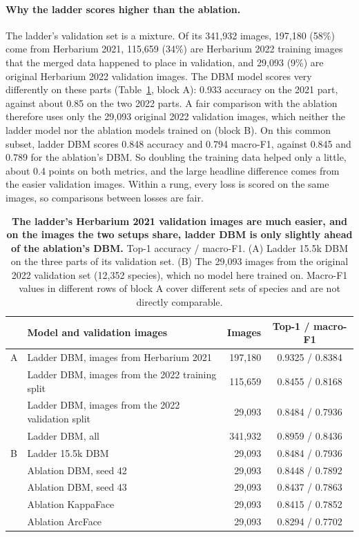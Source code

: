 \documentclass[11pt]{article}
\begin{document}
\paragraph{Why the ladder scores higher than the ablation.} The ladder's validation set is
a mixture. Of its 341{,}932 images, 197{,}180 (58\%) come from Herbarium 2021, 115{,}659
(34\%) are Herbarium 2022 training images that the merged data happened to place in
validation, and 29{,}093 (9\%) are original Herbarium 2022 validation images. The DBM
model scores very differently on these parts (Table~\ref{tab:datacheck}, block A): 0.933
accuracy on the 2021 part, against about 0.85 on the two 2022 parts. A fair comparison with
the ablation therefore uses only the 29{,}093 original 2022 validation images, which
neither the ladder model nor the ablation models trained on (block B). On this common
subset, ladder DBM scores 0.848 accuracy and 0.794 macro-F1, against 0.845 and 0.789 for
the ablation's DBM. So doubling the training data helped only a little, about 0.4 points on
both metrics, and the large headline difference comes from the easier validation images.
Within a rung, every loss is scored on the same images, so comparisons between losses are
fair.

\begin{table}[t]
\centering
\small
\caption{\textbf{The ladder's Herbarium 2021 validation images are much easier, and on the
images the two setups share, ladder DBM is only slightly ahead of the ablation's DBM.}
Top-1 accuracy / macro-F1. (A) Ladder 15.5k DBM on the three parts of its validation set.
(B) The 29{,}093 images from the original 2022 validation set (12{,}352 species), which no
model here trained on. Macro-F1 values in different rows of block A cover different sets
of species and are not directly comparable.}
\label{tab:datacheck}
\footnotesize
\begin{tabular}{@{}llrc@{}}
\toprule
 & Model and validation images & Images & Top-1 / macro-F1 \\
\midrule
A & Ladder DBM, images from Herbarium 2021 & 197{,}180 & 0.9325 / 0.8384 \\
  & Ladder DBM, images from the 2022 training split & 115{,}659 & 0.8455 / 0.8168 \\
  & Ladder DBM, images from the 2022 validation split & 29{,}093 & 0.8484 / 0.7936 \\
  & Ladder DBM, all & 341{,}932 & 0.8959 / 0.8436 \\
\midrule
B & Ladder 15.5k DBM & 29{,}093 & 0.8484 / 0.7936 \\
  & Ablation DBM, seed 42 & 29{,}093 & 0.8448 / 0.7892 \\
  & Ablation DBM, seed 43 & 29{,}093 & 0.8437 / 0.7863 \\
  & Ablation KappaFace & 29{,}093 & 0.8415 / 0.7852 \\
  & Ablation ArcFace & 29{,}093 & 0.8294 / 0.7702 \\
\bottomrule
\end{tabular}
\end{table}
\end{document}
